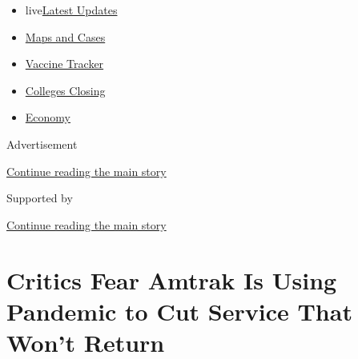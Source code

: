 \begin{itemize}
\tightlist
\item
  live\href{https://www.nytimes3xbfgragh.onion/2020/08/21/world/covid-19-coronavirus.html?name=styln-coronavirus-national\&region=TOP_BANNER\&variant=undefined\&block=storyline_menu_recirc\&action=click\&pgtype=Article\&impression_id=48f69fa1-e3a6-11ea-92a9-439cc713b6c5}{Latest
  Updates}
\item
  \href{https://www.nytimes3xbfgragh.onion/interactive/2020/us/coronavirus-us-cases.html?name=styln-coronavirus-national\&region=TOP_BANNER\&variant=undefined\&block=storyline_menu_recirc\&action=click\&pgtype=Article\&impression_id=48f69fa2-e3a6-11ea-92a9-439cc713b6c5}{Maps
  and Cases}
\item
  \href{https://www.nytimes3xbfgragh.onion/interactive/2020/science/coronavirus-vaccine-tracker.html?name=styln-coronavirus-national\&region=TOP_BANNER\&variant=undefined\&block=storyline_menu_recirc\&action=click\&pgtype=Article\&impression_id=48f69fa3-e3a6-11ea-92a9-439cc713b6c5}{Vaccine
  Tracker}
\item
  \href{https://www.nytimes3xbfgragh.onion/2020/08/19/us/colleges-closing-covid.html?name=styln-coronavirus-national\&region=TOP_BANNER\&variant=undefined\&block=storyline_menu_recirc\&action=click\&pgtype=Article\&impression_id=48f69fa4-e3a6-11ea-92a9-439cc713b6c5}{Colleges
  Closing}
\item
  \href{https://www.nytimes3xbfgragh.onion/live/2020/08/20/business/stock-market-today-coronavirus?name=styln-coronavirus-national\&region=TOP_BANNER\&variant=undefined\&block=storyline_menu_recirc\&action=click\&pgtype=Article\&impression_id=48f69fa5-e3a6-11ea-92a9-439cc713b6c5}{Economy}
\end{itemize}

Advertisement

\protect\hyperlink{after-top}{Continue reading the main story}

Supported by

\protect\hyperlink{after-sponsor}{Continue reading the main story}

\hypertarget{critics-fear-amtrak-is-using-pandemic-to-cut-service-that-wont-return}{%
\section{Critics Fear Amtrak Is Using Pandemic to Cut Service That Won't
Return}\label{critics-fear-amtrak-is-using-pandemic-to-cut-service-that-wont-return}}

